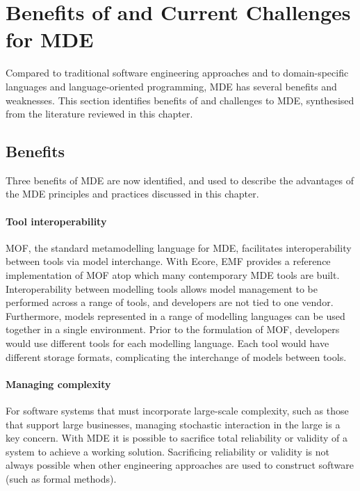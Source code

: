 
\section{Benefits of and Current Challenges for MDE}
\label{sec:mde_benefits_and_challenges}
Compared to traditional software engineering approaches and to domain-specific languages and language-oriented programming, MDE has several benefits and weaknesses. This section identifies benefits of and challenges to MDE, synthesised from the literature reviewed in this chapter.

\subsection{Benefits}
\label{subsec:mde_benefits}
Three benefits of MDE are now identified, and used to describe the advantages of the MDE principles and practices discussed in this chapter. 

\paragraph{Tool interoperability} MOF, the standard metamodelling language for MDE, facilitates interoperability between tools via model interchange. With Ecore, EMF provides a reference implementation of MOF atop which many contemporary MDE tools are built. Interoperability between modelling tools allows model management to be performed across a range of tools, and developers are not tied to one vendor. Furthermore, models represented in a range of modelling languages can be used together in a single environment. Prior to the formulation of MOF, developers would use different tools for each modelling language. Each tool would have different storage formats, complicating the interchange of models between tools.

\paragraph{Managing complexity} For software systems that must incorporate large-scale complexity, such as those that support large businesses, managing stochastic interaction in the large is a key concern. With MDE it is possible to sacrifice total reliability or validity of a system to achieve a working solution. Sacrificing reliability or validity is not always possible when other engineering approaches are used to construct software (such as formal methods).  

